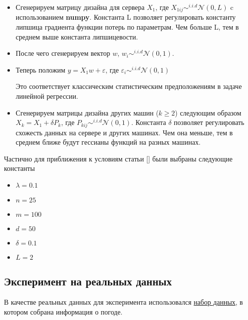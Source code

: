 \documentclass[a4paper,12pt]{extarticle}
\begin{document}
    \begin{itemize}
    \item  Сгенерируем матрицу дизайна для сервера $X_1$,
    где $X_{1ij} \sim^{i.i.d} \mathcal{N}(0, L)$ c использованием  \textbf{numpy}.
    Константа L позволяет регулировать константу липшица градиента функции потерь по параметрам.
    Чем больше L, тем в среднем выше константа липшицевости. 
    
    \item После чего сгенерируем вектор $w$, $ w_i \sim^{i.i.d} \mathcal{N}(0, 1)$. 
    
    \item Теперь положим $y = X_1w + \varepsilon$, где $\varepsilon_i \sim^{i.i.d} \mathcal{N}(0, 1)$
    \newcommand\tab[1][1cm]{\hspace*{#1}}
    

    \tab{} Это соответствует классическим статистическим предположениям в задаче линейной регрессии. 

    \item Сгенерируем матрицы дизайна других машин ($k \geq 2$) следующим образом $X_k = X_1 + \delta P_k$,
     где $P_{kij} \sim^{i.i.d} \mathcal{N}(0, 1)$.
    Константа $\delta$ позволяет регулировать схожесть данных на сервере и других машинах.
    Чем она меньше, тем в среднем ближе будут гессианы функций на разных машинах. 
    
    \end{itemize}

    Частично для приближения к условиям статьи [] были выбраны следующие константы 
    \begin{itemize}
        \item $\lambda = 0.1$
        \item $n = 25$
        \item $m = 100$
        \item $d = 50$
        \item $\delta = 0.1$
        \item $L = 2$
    \end{itemize}

    \subsection{Эксперимент на реальных данных}
    В качестве реальных данных для эксперимента использовался
    \href{https://www.kaggle.com/datasets/budincsevity/szeged-weather/data}{набор данных},
    в котором собрана информация о погоде. 
 
\end{document}
